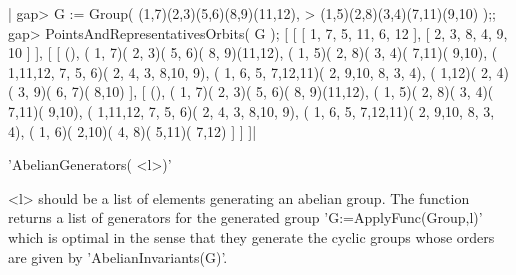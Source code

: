 |    gap> G := Group( (1,7)(2,3)(5,6)(8,9)(11,12),
    >                (1,5)(2,8)(3,4)(7,11)(9,10) );;
    gap> PointsAndRepresentativesOrbits( G );
    [ [ [ 1, 7, 5, 11, 6, 12 ], [ 2, 3, 8, 4, 9, 10 ] ],
      [ [ (), ( 1, 7)( 2, 3)( 5, 6)( 8, 9)(11,12),
              ( 1, 5)( 2, 8)( 3, 4)( 7,11)( 9,10),
              ( 1,11,12, 7, 5, 6)( 2, 4, 3, 8,10, 9),
              ( 1, 6, 5, 7,12,11)( 2, 9,10, 8, 3, 4),
              ( 1,12)( 2, 4)( 3, 9)( 6, 7)( 8,10) ],
          [ (), ( 1, 7)( 2, 3)( 5, 6)( 8, 9)(11,12),
              ( 1, 5)( 2, 8)( 3, 4)( 7,11)( 9,10),
              ( 1,11,12, 7, 5, 6)( 2, 4, 3, 8,10, 9),
              ( 1, 6, 5, 7,12,11)( 2, 9,10, 8, 3, 4),
              ( 1, 6)( 2,10)( 4, 8)( 5,11)( 7,12) ] ] ]|

%
%

'AbelianGenerators( <l>)'

<l>  should be a list of elements generating an abelian group. The function
returns a list of generators for the generated group
'G:=ApplyFunc(Group,l)'  which is optimal  in the sense  that they generate
the cyclic groups whose orders are given by 'AbelianInvariants(G)'.

